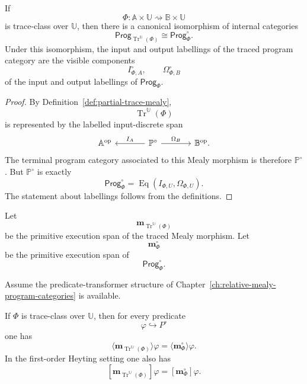 \begin{theorem}
\label{thm:program-category-of-traced-mealy}
If
\[
\Phi:
\mathbb A\times\mathbb U
\rightsquigarrow
\mathbb B\times\mathbb U
\]
is trace-class over \(\mathbb U\), then there is a canonical isomorphism of
internal categories
\[
\mathsf{Prog}_{\operatorname{Tr}^{\mathbb U}(\Phi)}
\cong
\mathsf{Prog}^{\circ}_{\Phi}.
\]
Under this isomorphism, the input and output labellings of the traced program
category are the visible components
\[
I_{\Phi,A}^{\circ},
\qquad
\Omega_{\Phi,B}^{\circ}
\]
of the input and output labellings of \(\mathsf{Prog}_\Phi\).
\end{theorem}

\begin{proof}
By Definition~\ref{def:partial-trace-mealy},
\[
\operatorname{Tr}^{\mathbb U}(\Phi)
\]
is represented by the labelled input-discrete span
\[
\begin{tikzcd}[column sep=large]
\mathbb A^{\mathrm{op}}
&
\mathbb P^\circ
  \arrow[l, "I_A"']
  \arrow[r, "\Omega_B"]
&
\mathbb B^{\mathrm{op}} .
\end{tikzcd}
\]
The terminal program category associated to this Mealy morphism is therefore
\(\mathbb P^\circ\).  But \(\mathbb P^\circ\) is exactly
\[
\mathsf{Prog}^{\circ}_{\Phi}
=
\operatorname{Eq}(I_{\Phi,U},\Omega_{\Phi,U}).
\]
The statement about labellings follows from the definitions.
\end{proof}

Let
\[
\mathbf m_{\operatorname{Tr}^{\mathbb U}(\Phi)}
\]
be the primitive execution span of the traced Mealy morphism.  Let
\[
\mathbf m_{\Phi}^{\circ}
\]
be the primitive execution span of
\[
\mathsf{Prog}^{\circ}_{\Phi}.
\]

\begin{corollary}
\label{cor:diamonds-boxes-feedback-closure}
Assume the predicate-transformer structure of
Chapter~\ref{ch:relative-mealy-program-categories} is available.

If \(\Phi\) is trace-class over \(\mathbb U\), then for every predicate
\[
\varphi\hookrightarrow P^\circ
\]
one has
\[
\langle
\mathbf m_{\operatorname{Tr}^{\mathbb U}(\Phi)}
\rangle\varphi
=
\langle
\mathbf m_{\Phi}^{\circ}
\rangle\varphi.
\]
In the first-order Heyting setting one also has
\[
[
\mathbf m_{\operatorname{Tr}^{\mathbb U}(\Phi)}
]\varphi
=
[
\mathbf m_{\Phi}^{\circ}
]\varphi.
\]
\end{corollary}


